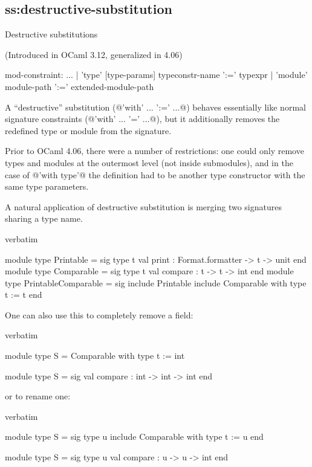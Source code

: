 \subsection{ss:destructive-substitution}{Destructive substitutions}

(Introduced in OCaml 3.12, generalized in 4.06)

\begin{syntax}
mod-constraint:
          ...
        | 'type' [type-params] typeconstr-name ':=' typexpr
        | 'module' module-path ':=' extended-module-path
\end{syntax}

A ``destructive'' substitution (@'with' ... ':=' ...@) behaves essentially like
normal signature constraints (@'with' ... '=' ...@), but it additionally removes
the redefined type or module from the signature.

Prior to OCaml 4.06, there were a number of restrictions: one could only remove
types and modules at the outermost level (not inside submodules), and in the
case of @'with type'@ the definition had to be another type constructor with the
same type parameters.

A natural application of destructive substitution is merging two
signatures sharing a type name.
\begin{camlexample}{verbatim}
\begin{caml}
\begin{camlinput}
module type Printable = sig
  type t
  val print : Format.formatter -> t -> unit
end
module type Comparable = sig
  type t
  val compare : t -> t -> int
end
module type PrintableComparable = sig
  include Printable
  include Comparable with type t := t
end
\end{camlinput}
\end{caml}
\end{camlexample}

One can also use this to completely remove a field:
\begin{camlexample}{verbatim}
\begin{caml}
\begin{camlinput}
module type S = Comparable with type t := int
\end{camlinput}
\begin{camloutput}
module type S = sig val compare : int -> int -> int end
\end{camloutput}
\end{caml}
\end{camlexample}
or to rename one:
\begin{camlexample}{verbatim}
\begin{caml}
\begin{camlinput}
module type S = sig
  type u
  include Comparable with type t := u
end
\end{camlinput}
\begin{camloutput}
module type S = sig type u val compare : u -> u -> int end
\end{camloutput}
\end{caml}
\end{camlexample}

